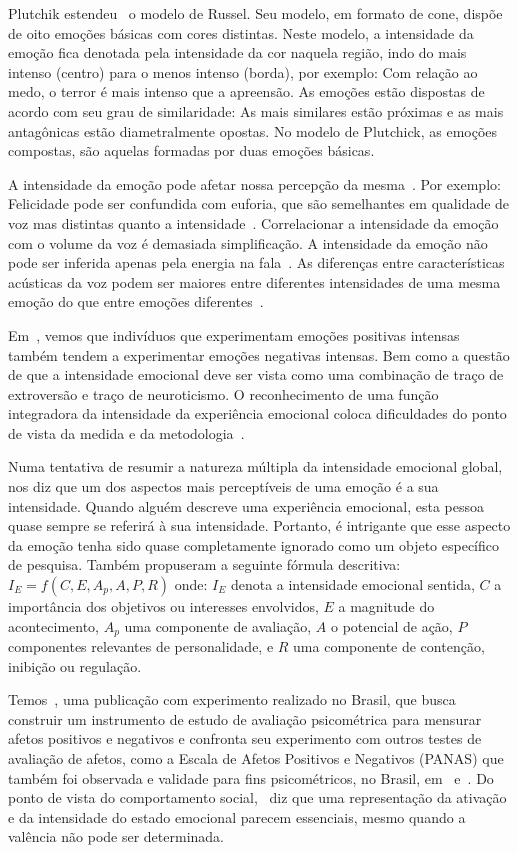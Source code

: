 Plutchik estendeu~\cite{57} o modelo de Russel. Seu modelo, em formato de cone, dispõe de oito emoções básicas com cores distintas. Neste modelo, a intensidade da emoção fica denotada pela intensidade da cor naquela região, indo do mais intenso (centro) para o menos intenso (borda), por exemplo: Com relação ao medo, o terror é mais intenso que a apreensão. As emoções estão dispostas de acordo com seu grau de similaridade: As mais similares estão próximas e as mais antagônicas estão diametralmente opostas. No modelo de Plutchick, as emoções compostas, são aquelas formadas por duas emoções básicas.

A intensidade da emoção pode afetar nossa percepção da mesma~\cite{18.46}. Por exemplo: Felicidade pode ser confundida com euforia, que são semelhantes em qualidade de voz mas distintas quanto a intensidade~\cite{18.9}. Correlacionar a intensidade da emoção com o volume da voz é demasiada simplificação. A intensidade da emoção não pode ser inferida apenas pela energia na fala~\cite{18.12}. As diferenças entre características acústicas da voz podem ser maiores entre diferentes intensidades de uma mesma emoção do que entre emoções diferentes~\cite{18.46}. 

Em~\cite{emoint1}, vemos que indivíduos que experimentam emoções positivas intensas também tendem a experimentar emoções negativas intensas. Bem como a questão de que a intensidade emocional deve ser vista como uma combinação de traço de extroversão e traço de neuroticismo. O reconhecimento de uma função integradora da intensidade da experiência emocional coloca dificuldades do ponto de vista da medida e da metodologia~\cite{emoint2}.

Numa tentativa de resumir a natureza múltipla da intensidade emocional global,~\cite{emoint2.1} nos diz que um dos aspectos mais perceptíveis de uma emoção é a sua intensidade. Quando alguém descreve uma experiência emocional, esta pessoa quase sempre se referirá à sua intensidade. Portanto, é intrigante que esse aspecto da emoção tenha sido quase completamente ignorado como um objeto específico de pesquisa. Também propuseram a seguinte fórmula descritiva: $I_E = f(C, E, A_p, A, P, R)$ onde: $I_E$ denota a intensidade emocional sentida, $C$ a importância dos objetivos ou interesses envolvidos, $E$ a magnitude do acontecimento, $A_p$ uma componente de avaliação, $A$ o potencial de ação, $P$ componentes relevantes de personalidade, e $R$ uma componente de contenção, inibição ou regulação.

Temos~\cite{emoint3}, uma publicação com experimento realizado no Brasil, que busca construir um instrumento de estudo de avaliação psicométrica para mensurar afetos positivos e negativos e confronta seu experimento com outros testes de avaliação de afetos, como a Escala de Afetos Positivos e Negativos (\acrshort{PANAS}) que também foi observada e validade para fins psicométricos, no Brasil, em~\cite{panas1} e~\cite{panas2}. Do ponto de vista do comportamento social,~\cite{16} diz que uma representação da ativação e da intensidade do estado emocional parecem essenciais, mesmo quando a valência não pode ser determinada.


